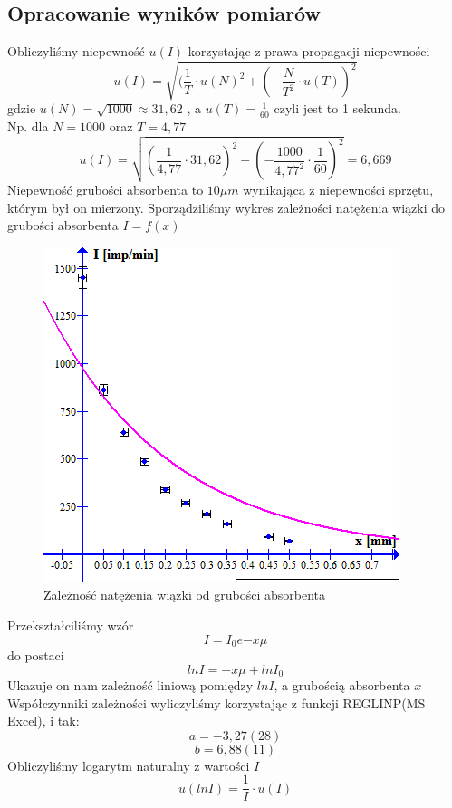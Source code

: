 \documentclass{article}
\begin{document}
\subsection{Opracowanie wyników pomiarów}
Obliczyliśmy niepewność $u(I)$ korzystając z prawa propagacji niepewności
$$u(I) = \sqrt{(\frac{1}{T} \cdot u(N)^2 + (-\frac{N}{T^2} \cdot u(T))^2}$$
gdzie $u(N) = \sqrt{1000} \approx 31,62$ , a $u(T) = \frac{1}{60}$ czyli jest to 1 sekunda.\\
Np. dla $N = 1000$ oraz $T = 4,77$
$$u(I) = \sqrt{(\frac{1}{4,77} \cdot 31,62)^2 + (-\frac{1000}{4,77^2} \cdot \frac{1}{60})^2} = 6,669$$ 
Niepewność grubości absorbenta to $10\mu m$ wynikająca z niepewności sprzętu, którym był on mierzony.
Sporządziliśmy wykres zależności natężenia wiązki do grubości absorbenta $I = f(x)$
\begin{figure}[ht]
\caption{Zależność natężenia wiązki od grubości absorbenta}
\centering
\includegraphics{wykres_1.png}
\end{figure}
Przekształciliśmy wzór 
$$I = I_0e{-x\mu }$$ 
do postaci
$$lnI = - x\mu + lnI_0 $$
Ukazuje on nam zależność liniową pomiędzy $lnI$, a grubością absorbenta $x$
Współczynniki zależności wyliczyliśmy korzystając z funkcji REGLINP(MS Excel), i tak:
$$a = -3,27(28)$$
$$b = 6,88(11)$$
Obliczyliśmy logarytm naturalny z wartości $I$
$$u(lnI) = \frac{1}{I} \cdot u(I)$$
\end{document}
